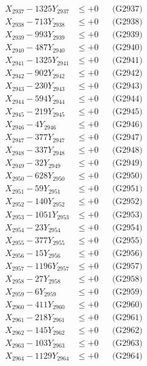\documentclass[a4paper,10pt]{article}
\begin{document}
{\begin{align}
X_{2937} - 1325Y_{2937} &\leq +0 && \text{(G2937)} \\
X_{2938} - 713Y_{2938} &\leq +0 && \text{(G2938)} \\
X_{2939} - 993Y_{2939} &\leq +0 && \text{(G2939)} \\
X_{2940} - 487Y_{2940} &\leq +0 && \text{(G2940)} \\
\allowbreak
X_{2941} - 1325Y_{2941} &\leq +0 && \text{(G2941)} \\
X_{2942} - 902Y_{2942} &\leq +0 && \text{(G2942)} \\
X_{2943} - 230Y_{2943} &\leq +0 && \text{(G2943)} \\
X_{2944} - 594Y_{2944} &\leq +0 && \text{(G2944)} \\
X_{2945} - 219Y_{2945} &\leq +0 && \text{(G2945)} \\
X_{2946} - 4Y_{2946} &\leq +0 && \text{(G2946)} \\
X_{2947} - 377Y_{2947} &\leq +0 && \text{(G2947)} \\
X_{2948} - 337Y_{2948} &\leq +0 && \text{(G2948)} \\
X_{2949} - 32Y_{2949} &\leq +0 && \text{(G2949)} \\
X_{2950} - 628Y_{2950} &\leq +0 && \text{(G2950)} \\
\allowbreak
X_{2951} - 59Y_{2951} &\leq +0 && \text{(G2951)} \\
X_{2952} - 140Y_{2952} &\leq +0 && \text{(G2952)} \\
X_{2953} - 1051Y_{2953} &\leq +0 && \text{(G2953)} \\
X_{2954} - 23Y_{2954} &\leq +0 && \text{(G2954)} \\
X_{2955} - 377Y_{2955} &\leq +0 && \text{(G2955)} \\
X_{2956} - 15Y_{2956} &\leq +0 && \text{(G2956)} \\
X_{2957} - 1196Y_{2957} &\leq +0 && \text{(G2957)} \\
X_{2958} - 27Y_{2958} &\leq +0 && \text{(G2958)} \\
X_{2959} - 6Y_{2959} &\leq +0 && \text{(G2959)} \\
X_{2960} - 411Y_{2960} &\leq +0 && \text{(G2960)} \\
\allowbreak
X_{2961} - 218Y_{2961} &\leq +0 && \text{(G2961)} \\
X_{2962} - 145Y_{2962} &\leq +0 && \text{(G2962)} \\
X_{2963} - 103Y_{2963} &\leq +0 && \text{(G2963)} \\
X_{2964} - 1129Y_{2964} &\leq +0 && \text{(G2964)} \\

\end{align}}
\end{document}
